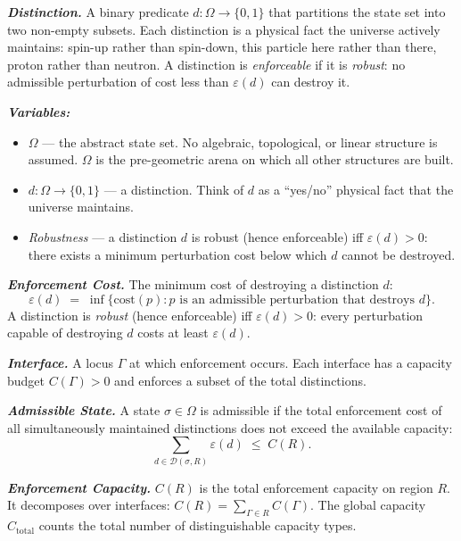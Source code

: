 \documentclass[11pt]{article}
\newenvironment{varlist}{\begin{itemize}[nosep,leftmargin=2em]}{\end{itemize}}
\begin{document}
\begin{tcolorbox}[apfbox, title={Definitions (Distinction, Enforcement Cost, Interface, Admissible State, Capacity)}]
\textbf{\textit{Distinction.}} A binary predicate $d: \Omega \to \{0, 1\}$ that partitions the state set into two non-empty subsets.  Each distinction is a physical fact the universe actively maintains: spin-up rather than spin-down, this particle here rather than there, proton rather than neutron.  A distinction is \emph{enforceable} if it is \emph{robust}: no admissible perturbation of cost less than $\varepsilon(d)$ can destroy it.

\smallskip\noindent\textbf{\textit{Variables:}}
\begin{varlist}
\item $\Omega$ --- the abstract state set.  No algebraic, topological, or linear structure is assumed.  $\Omega$ is the pre-geometric arena on which all other structures are built.
\item $d: \Omega \to \{0,1\}$ --- a distinction.  Think of $d$ as a ``yes/no'' physical fact that the universe maintains.
\item \textit{Robustness} --- a distinction $d$ is robust (hence enforceable) iff $\varepsilon(d) > 0$: there exists a minimum perturbation cost below which $d$ cannot be destroyed.
\end{varlist}

\medskip
\textbf{\textit{Enforcement Cost.}} The minimum cost of destroying a distinction $d$:
\[
\varepsilon(d) \;=\; \inf\bigl\{\mathrm{cost}(p) : p \text{ is an admissible perturbation that destroys } d\bigr\}.
\]
A distinction is \emph{robust} (hence enforceable) iff $\varepsilon(d) > 0$: every perturbation capable of destroying $d$ costs at least $\varepsilon(d)$.

\medskip
\textbf{\textit{Interface.}} A locus $\Gamma$ at which enforcement occurs.  Each interface has a capacity budget $C(\Gamma) > 0$ and enforces a subset of the total distinctions.

\medskip
\textbf{\textit{Admissible State.}} A state $\sigma \in \Omega$ is admissible if the total enforcement cost of all simultaneously maintained distinctions does not exceed the available capacity:
\[
\sum_{d \in \mathcal{D}(\sigma, R)} \varepsilon(d) \;\le\; C(R).
\]

\medskip
\textbf{\textit{Enforcement Capacity.}} $C(R)$ is the total enforcement capacity on region $R$.  It decomposes over interfaces: $C(R) = \sum_{\Gamma \in R} C(\Gamma)$.  The global capacity $C_{\mathrm{total}}$ counts the total number of distinguishable capacity types.


\end{tcolorbox}
\end{document}
